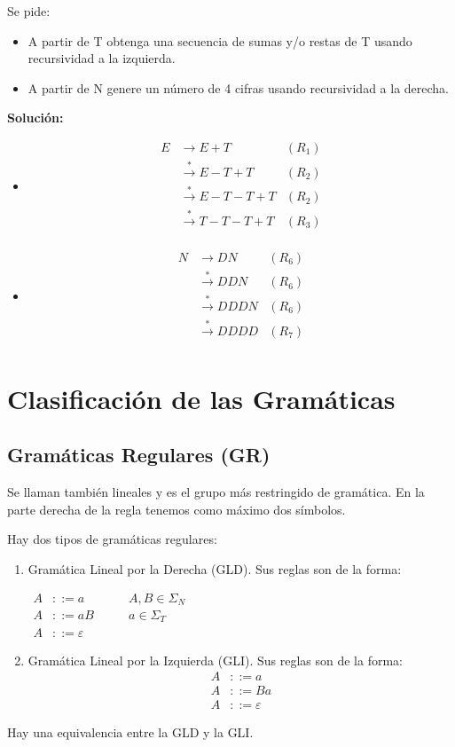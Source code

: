 Se pide:
\begin{itemize}
\item A partir de T obtenga una secuencia de sumas y/o restas de T usando recursividad a la izquierda.
\item A partir de N genere un número de 4 cifras usando recursividad a la derecha.
\end{itemize}

\textbf{Solución: }
\begin{itemize}
\item 
\begin{align*}
E	&\rightarrow E+T	\qquad &(R_1)	\\
	&\xrightarrow{*}E-T+T	&(R_2)	\\
	&\xrightarrow{*}E-T-T+T	&(R_2)	\\
	&\xrightarrow{*}T-T-T+T	&(R_3)	\\
\end{align*}
\item 
\begin{align*}
N	&\rightarrow DN		&(R_6)	\\
	&\xrightarrow{*}DDN	&(R_6)	\\
	&\xrightarrow{*}DDDN	&(R_6)	\\
	&\xrightarrow{*}DDDD	&(R_7)	\\
\end{align*}
\end{itemize}

\section{Clasificación de las Gramáticas}

\subsection{Gramáticas Regulares (GR)}
Se llaman también lineales y es el grupo más restringido de gramática. En la parte derecha de la regla tenemos como máximo dos símbolos.

Hay dos tipos de gramáticas regulares:
\begin{enumerate}
\item Gramática Lineal por la Derecha (GLD). Sus reglas son de la forma:

$\begin{array}{clc}
A&::=a	&\qquad A,B\in \Sigma_N \\
A&::=aB	&\qquad a\in\Sigma_T	\\
A&::=\varepsilon	&
\end{array}$
	
\item Gramática Lineal por la Izquierda (GLI). Sus reglas son de la forma:
\begin{align*}
A&::=a	\\
A&::=Ba	\\
A&::=\varepsilon
\end{align*}
\end{enumerate}
Hay una equivalencia entre la GLD y la GLI.

